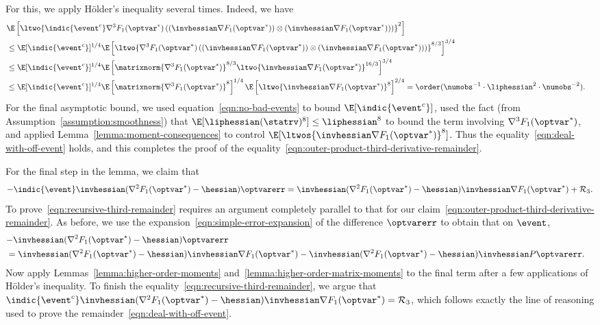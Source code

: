 \documentclass[11pt,twoside]{article}
\theoremstyle{definition}
\begin{document}
For this, we apply H\"older's inequality several times. Indeed, we have
\begin{align*}
  \lefteqn{\E\left[\ltwo{\indic{\event^c} \nabla^3 F_1(\optvar^*)
        \left((\invhessian \nabla F_1(\optvar^*)) \otimes
        (\invhessian \nabla F_1(\optvar^*))\right)}^2\right]} \\
  & \le
  \E[\indic{\event^c}]^{1/4}
  \E\left[\ltwo{\nabla^3 F_1(\optvar^*)
      \left((\invhessian \nabla F_1(\optvar^*)) \otimes
      (\invhessian \nabla F_1(\optvar^*))\right)}^{8/3}\right]^{3/4} \\
  & \le \E[\indic{\event^c}]^{1/4}
  \E\left[\matrixnorm{\nabla^3 F_1(\optvar^*)}^{8/3}
    \ltwo{\invhessian \nabla F_1(\optvar^*)}^{16/3}\right]^{3/4} \\
  & \le \E[\indic{\event^c}]^{1/4}
  \E\left[\matrixnorm{\nabla^3 F_1(\optvar^*)}^8\right]^{1/4}
  \E\left[\ltwo{\invhessian \nabla F_1(\optvar^*)}^8\right]^{2/4}
  = \order(\numobs^{-1} \cdot \liphessian^2 \cdot \numobs^{-2}).
\end{align*}
For the final asymptotic bound, we used
equation~\eqref{eqn:no-bad-events} to bound $\E[\indic{\event^c}]$,
used the fact (from Assumption~\ref{assumption:smoothness}) that
$\E[\liphessian(\statrv)^8] \le \liphessian^8$ to bound the term
involving $\nabla^3 F_1(\optvar^*)$, and applied
Lemma~\ref{lemma:moment-consequences} to control
$\E[\ltwos{\invhessian \nabla F_1(\optvar^*)}^8]$.  Thus the
equality~\eqref{eqn:deal-with-off-event} holds, and this completes the
proof of the
equality~\eqref{eqn:outer-product-third-derivative-remainder}.

For the final step in the lemma, we claim that
\begin{equation}
  \label{eqn:recursive-third-remainder}
  -\indic{\event} \invhessian(\nabla^2 F_1(\optvar^*) - \hessian) \optvarerr
  = \invhessian(\nabla^2 F_1(\optvar^*) - \hessian)
  \invhessian \nabla F_1(\optvar^*) + \remainder_3.
\end{equation}
To prove~\eqref{eqn:recursive-third-remainder} requires an argument
completely parallel to that for our
claim~\eqref{eqn:outer-product-third-derivative-remainder}. As before,
we use the expansion~\eqref{eqn:simple-error-expansion} of the difference
$\optvarerr$ to obtain that on $\event$,
\begin{align*}
  \lefteqn{-\invhessian(\nabla^2 F_1(\optvar^*) - \hessian) \optvarerr} \\
  & = \invhessian(\nabla^2 F_1(\optvar^*) - \hessian) \invhessian
  \nabla F_1(\optvar^*)
  - \invhessian(\nabla^2 F_1(\optvar^*) - \hessian)\invhessian P
  \optvarerr.
\end{align*}
Now apply Lemmas~\ref{lemma:higher-order-moments}
and~\ref{lemma:higher-order-matrix-moments} to the final term after a few
applications of H\"older's inequality.  To finish the
equality~\eqref{eqn:recursive-third-remainder}, we argue that
$\indic{\event^c} \invhessian (\nabla^2 F_1(\optvar^*) - \hessian)
\invhessian \nabla F_1(\optvar^*) = \remainder_3$, which follows exactly the
line of reasoning used to prove the
remainder~\eqref{eqn:deal-with-off-event}.
\end{document}
